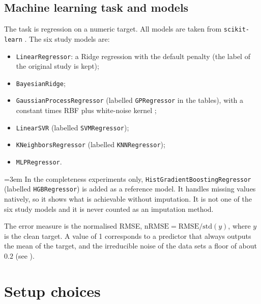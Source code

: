 \documentclass{Configuration_Files/PoliMi3i_thesis}
\begin{document}
\section{Machine learning task and models}
\label{sec:models}%
The task is regression on a numeric target. All models are taken from \texttt{scikit-learn} \citep{pedregosa2011}. The six study models are:
\begin{itemize}
    \item \texttt{LinearRegressor}: a Ridge regression with the default penalty (the label of the original study is kept);
    \item \texttt{BayesianRidge};
    \item \texttt{GaussianProcessRegressor} (labelled \texttt{GPRegressor} in the tables), with a constant times RBF plus white-noise kernel \citep{rasmussen2006};
    \item \texttt{LinearSVR} (labelled \texttt{SVMRegressor});
    \item \texttt{K\allowbreak Neighbors\allowbreak Regressor} (labelled \texttt{KNNRegressor});
    \item \texttt{MLPRegressor}.
\end{itemize}
{\emergencystretch=3em In the completeness experiments only, \texttt{Hist\allowbreak Gradient\allowbreak Boosting\allowbreak Regressor} (labelled \texttt{HGBRegressor}) is added as a reference model. It handles missing values natively, so it shows what is achievable without imputation. It is not one of the six study models and it is never counted as an imputation method.\par}

The error measure is the normalised RMSE, $\mathrm{nRMSE} = \mathrm{RMSE} / \mathrm{std}(y)$, where $y$ is the clean target. A value of 1 corresponds to a predictor that always outputs the mean of the target, and the irreducible noise of the data sets a floor of about $0.2$ (see ).

\chapter{Setup choices}
\label{ch:chapter_2}%
\end{document}
